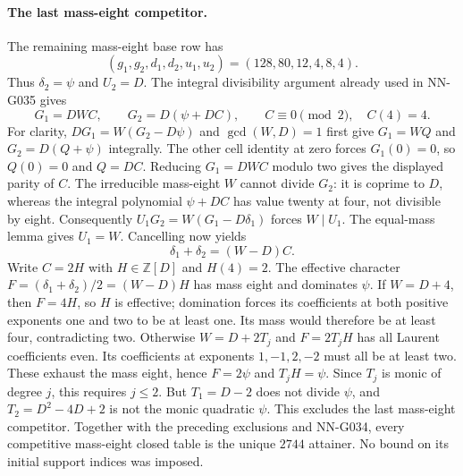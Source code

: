 \paragraph{The last mass-eight competitor.}
The remaining mass-eight base row has
\[
 (g_1,g_2,d_1,d_2,u_1,u_2)=(128,80,12,4,8,4).
\]
Thus $\delta_2=\psi$ and $U_2=D$. The integral divisibility
argument already used in NN-G035 gives
\[
 G_1=DWC,\qquad G_2=D(\psi+DC),\qquad
 C\equiv0\pmod2,\quad C(4)=4.
\]
For clarity, $DG_1=W(G_2-D\psi)$ and $\gcd(W,D)=1$
first give $G_1=WQ$ and $G_2=D(Q+\psi)$ integrally.
The other cell identity at zero forces $G_1(0)=0$,
so $Q(0)=0$ and $Q=DC$. Reducing $G_1=DWC$ modulo
two gives the displayed parity of $C$.
The irreducible mass-eight $W$ cannot divide $G_2$:
it is coprime to $D$, whereas the integral polynomial
$\psi+DC$ has value twenty at four, not divisible by eight.
Consequently $U_1G_2=W(G_1-D\delta_1)$ forces $W\mid U_1$.
The equal-mass lemma gives $U_1=W$. Cancelling now yields
\[
 \delta_1+\delta_2=(W-D)C.
\]
Write $C=2H$ with $H\in\mathbb Z[D]$ and $H(4)=2$.
The effective character
$F=(\delta_1+\delta_2)/2=(W-D)H$ has mass eight and
dominates $\psi$.
If $W=D+4$, then $F=4H$, so $H$ is effective;
domination forces its coefficients at both positive
exponents one and two to be at least one. Its mass
would therefore be at least four, contradicting two.
Otherwise $W=D+2T_j$ and $F=2T_jH$ has all Laurent
coefficients even. Its coefficients at exponents
$1,-1,2,-2$ must all be at least two. These exhaust
the mass eight, hence $F=2\psi$ and $T_jH=\psi$.
Since $T_j$ is monic of degree $j$, this requires
$j\le2$. But $T_1=D-2$ does not divide $\psi$, and
$T_2=D^2-4D+2$ is not the monic quadratic $\psi$.
This excludes the last mass-eight competitor.
Together with the preceding exclusions and NN-G034,
every competitive mass-eight closed table is the unique
$2744$ attainer. No bound on its initial support indices
was imposed.

